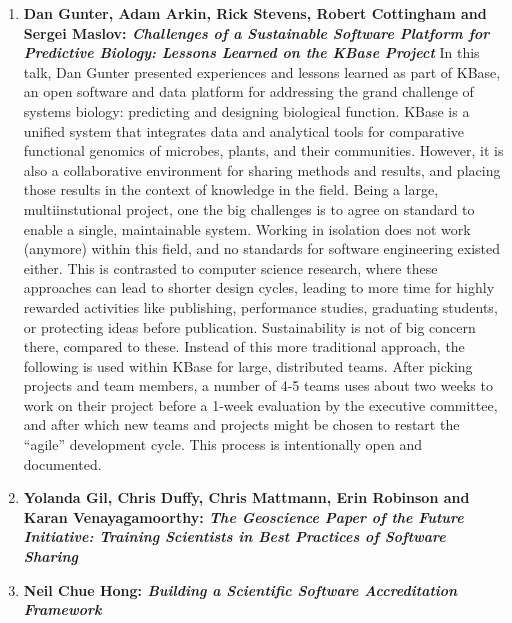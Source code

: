 \documentclass[11pt, oneside]{amsart}
\begin{document}
\begin{enumerate}
\item \textbf{Dan Gunter, Adam Arkin, Rick Stevens, Robert Cottingham and
Sergei Maslov: \textit{Challenges of a Sustainable Software Platform for Predictive
Biology: Lessons Learned on the KBase Project}}
In this talk, Dan Gunter presented experiences and lessons learned as part of
KBase, an open software and data platform for addressing the grand challenge of
systems biology: predicting and designing biological function. KBase is a
unified system that integrates data and analytical tools for comparative
functional genomics of microbes, plants, and their communities. However,
it is also a collaborative environment for sharing methods and results, and
placing those results in the context of knowledge in the field. Being a large,
multiinstutional project, one the big challenges is to agree on standard to
enable a single, maintainable system. Working in isolation does not work (anymore)
within this field, and no standards for software engineering existed either.
This is contrasted to computer science research, where these approaches can lead to
shorter design cycles, leading to more time for highly rewarded activities like
publishing, performance studies, graduating students, or protecting ideas
before publication. Sustainability is not of big concern there, compared to
these. Instead of this more traditional approach, the following is used within
KBase for large, distributed teams. After picking projects and team members, a
number of 4-5 teams uses about two weeks to work on their project before a
1-week evaluation by the executive committee, and after which new teams and
projects might be chosen to restart the ``agile'' development cycle. This
process is intentionally open and documented.

\item \textbf{Yolanda Gil, Chris Duffy, Chris Mattmann, Erin Robinson and Karan
Venayagamoorthy: \textit{The Geoscience Paper of the Future Initiative: Training
Scientists in Best Practices of Software Sharing}}

\item \textbf{Neil Chue Hong: \textit{Building a Scientific Software Accreditation
Framework}}


\end{enumerate}
\end{document}
